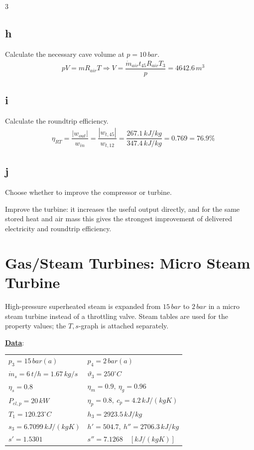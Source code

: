 \documentclass[9pt, landscape, a4paper]{article}
\begin{document}
\begin{multicols*}{3}
\subsection*{h}
Calculate the necessary cave volume at $p=10\,bar$.
\begingroup
\scriptsize
\begin{align*}
  & pV=mR_{air}T
  \Longrightarrow
  V=\dfrac{\dot m_{air}t_{45}R_{air}T_3}{p}
  =4642.6\,m^3
\end{align*}
\endgroup

\subsection*{i}
Calculate the roundtrip efficiency.
\begingroup
\scriptsize
\begin{align*}
  & \eta_{RT}=\dfrac{\left|w_{out}\right|}{w_{in}}
  =\dfrac{\left|w_{t,45}\right|}{w_{t,12}}
  =\dfrac{267.1\,kJ/kg}{347.4\,kJ/kg}=0.769=76.9\%
\end{align*}
\endgroup

\subsection*{j}
Choose whether to improve the compressor or turbine.

Improve the turbine: it increases the useful output directly, and for the same
stored heat and air mass this gives the strongest improvement of delivered
electricity and roundtrip efficiency.

\newcolumn
\section{Gas/Steam Turbines: Micro Steam Turbine}
High-pressure superheated steam is expanded from $15\,bar$ to $2\,bar$ in a
micro steam turbine instead of a throttling valve. Steam tables are used for the
property values; the $T,s$-graph is attached separately.

\textbf{\underline{Data}}:
\begin{center}
\setlength{\tabcolsep}{2pt}
\renewcommand{\arraystretch}{1.2}
\begin{tabular}{@{}ll@{}}
  $p_3=15\,bar(a)$ & $p_4=2\,bar(a)$\\
  $\dot m_s=6\,t/h=1.67\,kg/s$ & $\vartheta_3=250^\circ C$\\
  $\eta_s=0.8$ & $\eta_m=0.9,\ \eta_g=0.96$\\
  $P_{el,p}=20\,kW$ & $\eta_p=0.8,\ c_p=4.2\,kJ/(kgK)$\\
  $T_1=120.23^\circ C$ & $h_3=2923.5\,kJ/kg$\\
  $s_3=6.7099\,kJ/(kgK)$ & $h'=504.7,\ h''=2706.3\,kJ/kg$\\
  $s'=1.5301$ & $s''=7.1268\quad [kJ/(kgK)]$
\end{tabular}
\end{center}
\renewcommand{\arraystretch}{1}


\end{multicols*}
\end{document}
